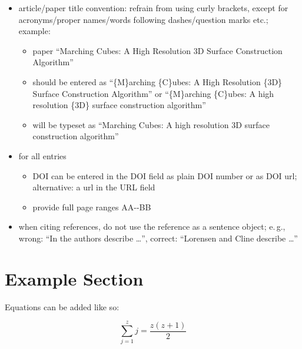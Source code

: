 \documentclass[widereview]{vgtc}             %
\begin{document}
\begin{itemize}
	\item article/paper title convention: refrain from using curly brackets, except for acronyms/proper names/words following dashes/question marks etc.; example:
		\begin{itemize}
			\item paper ``Marching Cubes: A High Resolution 3D Surface Construction Algorithm''
			\item should be entered as ``\{M\}arching \{C\}ubes: A High Resolution \{3D\} Surface Construction Algorithm'' or  ``\{M\}arching \{C\}ubes: A high resolution \{3D\} surface construction algorithm''
			\item will be typeset as ``Marching Cubes: A high resolution 3D surface construction algorithm''
		\end{itemize}
		\item for all entries
		\begin{itemize}
			\item DOI can be entered in the DOI field as plain DOI number or as DOI url; alternative: a url in the URL field
			\item provide full page ranges AA-{}-BB
		\end{itemize}
		
	\item when citing references, do not use the reference as a sentence object; e.\,g., wrong: ``In \cite{Lorensen:1987:MCA} the authors describe \dots'', correct: ``Lorensen and Cline \cite{Lorensen:1987:MCA} describe \dots''
\end{itemize}


\section{Example Section}

Equations can be added like so:

\begin{equation}
\label{eq:sum}
\sum_{j=1}^{z} j = \frac{z(z+1)}{2}
\end{equation}

\end{document}
